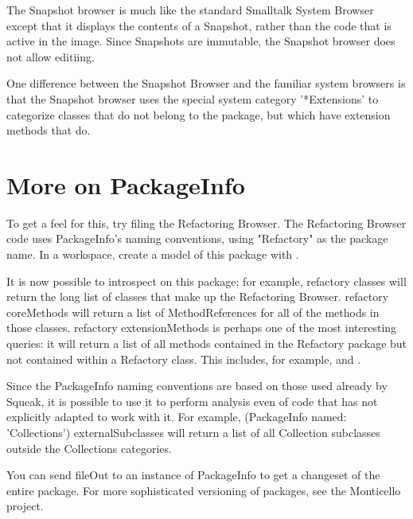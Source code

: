\documentclass[a4paper,10pt,twoside]{book}
\begin{document}
The Snapshot browser is much like the standard Smalltalk System Browser except that it displays the contents of a Snapshot, rather than the code that is active in the image. Since Snapshots are immutable, the Snapshot browser does not allow editiing.

One difference between the Snapshot Browser and the familiar system browsers is that the Snapshot browser uses the special system category '*Extensions' to categorize classes that do not belong to the package, but which have extension methods that do.

\section{More on PackageInfo}
To get a feel for this, try filing the Refactoring Browser. The Refactoring Browser code uses PackageInfo's naming conventions, using "Refactory" as the package name. In a workspace, create a model of this package with  . 

It is now possible to introspect on this package; for example, refactory classes will return the long list of classes that make up the Refactoring Browser. refactory coreMethods will return a list of MethodReferences for all of the methods in those classes. refactory extensionMethods is perhaps one of the most interesting queries: it will return a list of all methods contained in the Refactory package but not contained within a Refactory class. This includes, for example,  and .

Since the PackageInfo naming conventions are based on those used already by Squeak, it is possible to use it to perform analysis even of code that has not explicitly adapted to work with it. For example, (PackageInfo named: 'Collections') externalSubclasses will return a list of all Collection subclasses outside the Collections categories.

You can send fileOut to an instance of PackageInfo to get a changeset of the entire package. For more sophisticated versioning of packages, see the Monticello project.


\ifx\wholebook\relax\else
   
   
\end{document}
